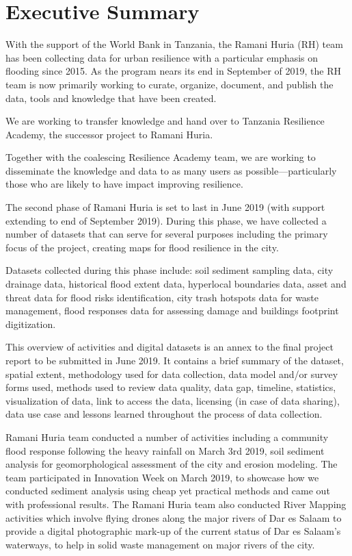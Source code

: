 \documentclass[a4paper,12pt,twoside]{article}
\begin{document}
\newpage
\section{Executive Summary}
\label{executivesummary}
\begin{multicols}{2}

With the support of the World Bank in Tanzania, the Ramani Huria (RH) team has been collecting data for urban resilience with a particular emphasis on flooding since 2015. As the program nears its end in September of 2019, the RH team is now primarily working to curate, organize, document, and publish the data, tools and knowledge that have been created.

We are working to transfer knowledge and hand over to Tanzania Resilience Academy, the successor project to Ramani Huria.

Together with the coalescing Resilience Academy team, we are working to disseminate the knowledge and data to as many users as possible---particularly those who are likely to have impact improving resilience.

The second phase of Ramani Huria is set to last in June 2019 (with support extending to end of September 2019). During this phase, we have collected a number of datasets that can serve for several purposes including the primary focus of the project, creating maps for flood resilience in the city. 

Datasets collected during this phase include: soil sediment sampling data, city drainage data, historical flood extent data, hyperlocal boundaries data, asset and threat data for flood risks identification, city trash hotspots data for waste management, flood responses data for assessing damage and buildings footprint digitization.

This overview of activities and digital datasets is an annex to the final project report to be submitted in June 2019. It contains a brief summary of the dataset, spatial extent, methodology used for data collection, data model and/or survey forms used, methods used to review data quality, data gap, timeline, statistics, visualization of data, link to access the data, licensing (in case of data sharing), data use case and lessons learned throughout the process of data collection.

Ramani Huria team conducted a number of activities including a community flood response following the heavy rainfall on March 3rd 2019, soil sediment analysis for geomorphological assessment of the city and erosion modeling. The team participated in Innovation Week on March 2019, to showcase how we conducted sediment analysis using cheap yet practical methods and came out with professional results. The Ramani Huria team also conducted River Mapping activities which involve flying drones along the major rivers of Dar es Salaam to  provide a digital photographic mark-up of the current status of Dar es Salaam’s waterways, to help in solid waste management on major rivers of the city.

\end{multicols}
\end{document}
